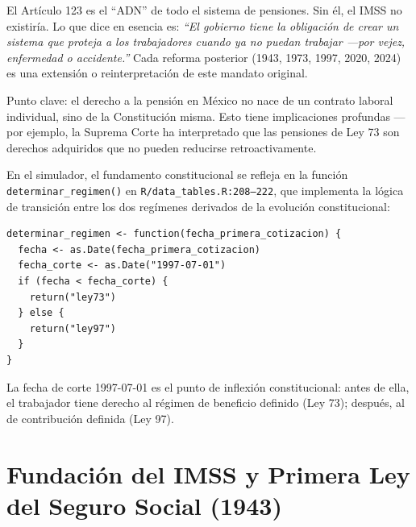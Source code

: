 \documentclass[11pt,a4paper]{report}
\begin{document}
\begin{tcolorbox}[colback=green!5!white, colframe=green!50!black, title=\textbf{Intuici\'on}]
El Art\'iculo 123 es el ``ADN'' de todo el sistema de pensiones. Sin \'el, el IMSS no existir\'ia. Lo que dice en esencia es: \emph{``El gobierno tiene la obligaci\'on de crear un sistema que proteja a los trabajadores cuando ya no puedan trabajar ---por vejez, enfermedad o accidente.''} Cada reforma posterior (1943, 1973, 1997, 2020, 2024) es una extensi\'on o reinterpretaci\'on de este mandato original.

Punto clave: el derecho a la pensi\'on en M\'exico no nace de un contrato laboral individual, sino de la Constituci\'on misma. Esto tiene implicaciones profundas ---por ejemplo, la Suprema Corte ha interpretado que las pensiones de Ley 73 son derechos adquiridos que no pueden reducirse retroactivamente.
\end{tcolorbox}

\begin{tcolorbox}[colback=orange!5!white, colframe=orange!75!black, title=\textbf{Aplicaci\'on en C\'odigo}]
En el simulador, el fundamento constitucional se refleja en la funci\'on \texttt{determinar\_regimen()} en \texttt{R/data\_tables.R:208--222}, que implementa la l\'ogica de transici\'on entre los dos reg\'imenes derivados de la evoluci\'on constitucional:

\begin{lstlisting}
determinar_regimen <- function(fecha_primera_cotizacion) {
  fecha <- as.Date(fecha_primera_cotizacion)
  fecha_corte <- as.Date("1997-07-01")
  if (fecha < fecha_corte) {
    return("ley73")
  } else {
    return("ley97")
  }
}
\end{lstlisting}

La fecha de corte 1997-07-01 es el punto de inflexi\'on constitucional: antes de ella, el trabajador tiene derecho al r\'egimen de beneficio definido (Ley 73); despu\'es, al de contribuci\'on definida (Ley 97).
\end{tcolorbox}

\section{Fundaci\'on del IMSS y Primera Ley del Seguro Social (1943)}
\end{document}
